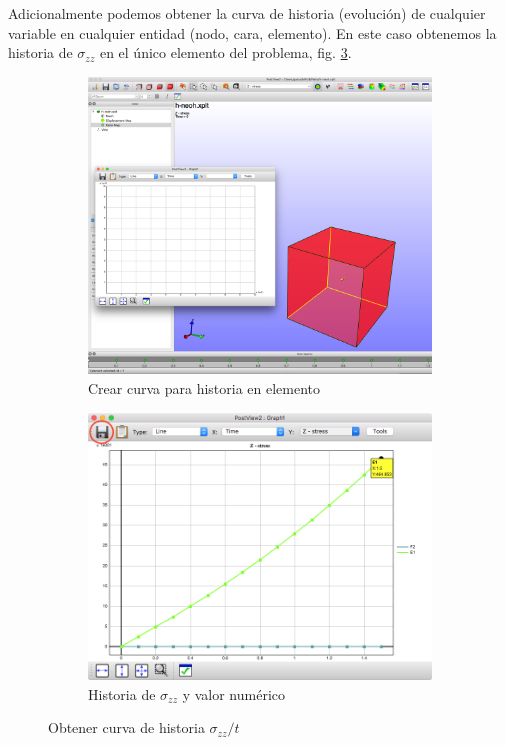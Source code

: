 Adicionalmente podemos obtener la curva de historia (evolución) de cualquier variable en cualquier entidad (nodo, cara, elemento).
En este caso obtenemos la historia de $\sigma_{zz}$ en el único elemento del problema, fig. \ref{fig:post-06-07}.
\begin{figure}[!htp]
\centering
\begin{subfigure}[b]{0.48\textwidth}
\centering
\includegraphics[width=\textwidth]{figuras_3/scr-post-06.png}
\caption{Crear curva para historia en elemento}
\label{fig:post-06}
\end{subfigure}
\begin{subfigure}[b]{0.48\textwidth}
\centering
\includegraphics[width=\textwidth]{figuras_3/scr-post-07m.png}
\caption{Historia de $\sigma_{zz}$ y valor numérico}
\label{fig:post-07}
\end{subfigure}
\caption{Obtener curva de historia $\sigma_{zz} / t$}
\label{fig:post-06-07}
\end{figure}
